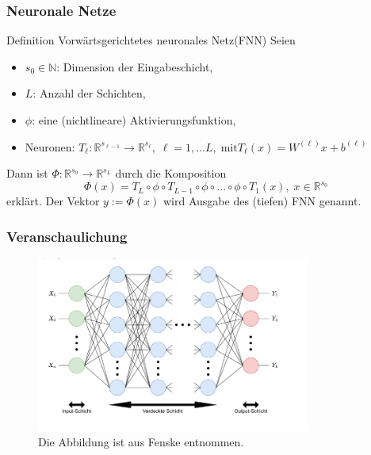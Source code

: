 \documentclass[10pt]{beamer} %
\newcommand{\RR}{\ensuremath{\mathbb{R}}}
\begin{document}
\begin{frame}
   \frametitle[]{Neuronale Netze}
   \begin{block}{Definition Vorwärtsgerichtetes neuronales Netz(FNN)}
      Seien 
      \begin{itemize}
         \item $s_0 \in \mathbb{N}$: Dimension der Eingabeschicht,
         \item $L$: Anzahl der Schichten, 
         \item $\phi$: eine (nichtlineare) Aktivierungsfunktion,
         \item Neuronen: $T_{\ell}: \RR^{s_{\ell-1}} \rightarrow \RR^{s_\ell}, \; \ell=1, \ldots L, \; \text{mit} T_{\ell}(x)=W^{(\ell)}x+b^{(\ell)}$
      \end{itemize}
      \pause
      Dann ist $\Phi: \RR^{s_0} \rightarrow \RR^{s_L}$ durch die Komposition 
      \begin{equation*}
         \Phi(x)=T_{L} \circ \phi \circ T_{L-1} \circ \phi \circ \ldots \circ \phi \circ T_1(x), \; x \in \RR^{s_0}
      \end{equation*}
      erklärt. Der Vektor $y:=\Phi(x)$ wird Ausgabe des (tiefen) FNN genannt.
   \end{block}
\end{frame}

\begin{frame}
   \frametitle[]{Veranschaulichung}
   \begin{figure}
      \includegraphics[width=0.8\textwidth]{pics/full_FFN.png}
      \caption[]{Die Abbildung ist aus Fenske\cite[]{fenske} entnommen.}
   \end{figure}
\end{frame}

\end{document}
